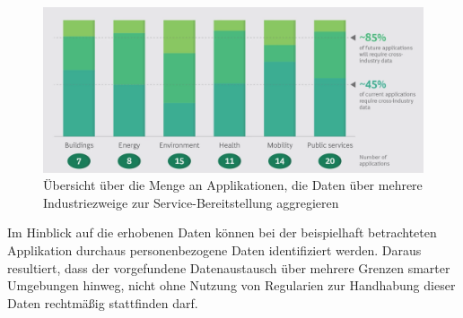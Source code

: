 \begin{figure}
    \centering
    \includegraphics[scale=0.2]{main/pictures/smart_city/Smart_City_Apps_Data_Req}
    \caption{Übersicht über die Menge an Applikationen, die Daten über mehrere Industriezweige zur Service-Bereitstellung aggregieren \cite{BCG2020}}
    \label{fig:data-aggregation-smart-city-apps}
\end{figure}

\noindent Im Hinblick auf die erhobenen Daten können bei der beispielhaft betrachteten Applikation durchaus personenbezogene Daten identifiziert werden. Daraus resultiert, dass der vorgefundene Datenaustausch über mehrere Grenzen smarter Umgebungen hinweg, nicht ohne Nutzung von Regularien zur Handhabung dieser Daten rechtmäßig stattfinden darf.\\


